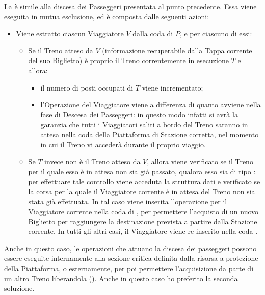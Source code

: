 \begin{description}
		La  è simile alla discesa dei Passeggeri presentata al punto precedente. Essa viene eseguita in mutua esclusione, ed è composta dalle seguenti azioni:
		\begin{itemize}
			\item Viene estratto ciascun Viaggiatore $V$ dalla coda  di $P$, e per ciascuno di essi:
			\begin{itemize}
				\item Se il Treno atteso da $V$ (informazione recuperabile dalla Tappa corrente del suo Biglietto) è proprio il Treno correntemente in esecuzione $T$ e  allora:
					\begin{itemize}
						\item il numero di posti occupati di $T$ viene incrementato;
						\item l'Operazione  del Viaggiatore viene  a differenza di quanto avviene nella fase di Descesa dei Passeggeri: in questo modo infatti si avrà la garanzia che tutti i Viaggiatori saliti a bordo del Treno saranno in attesa nella coda  della Piattaforma di Stazione corretta, nel momento in cui il Treno vi accederà durante il proprio viaggio. 
					\end{itemize}
				\item Se $T$ invece non è il Treno atteso da $V$, allora viene verificato se il Treno per il quale esso è in attesa non sia già passato, qualora esso sia di tipo : per effettuare tale controllo viene acceduta la struttura dati  e verificato se la corsa per la quale il Viaggiatore corrente è in attesa del Treno non sia stata già effettuata. In tal caso viene inserita l'operazione  per il Viaggiatore corrente nella coda di , per permettere l'acquisto di un nuovo Biglietto per raggiungere la destinazione prevista a partire dalla Stazione corrente. In tutti gli altri casi, il Viaggiatore viene re-inserito nella coda .
			\end {itemize}
		\end{itemize}
	\end {description}

	Anche in questo caso, le operazioni che attuano la discesa dei passeggeri possono essere eseguite internamente alla sezione critica definita dalla risorsa a protezione della Piattaforma, o esternamente, per poi permettere l'acquisizione da parte di un altro Treno liberandola (). Anche in questo caso ho preferito la seconda soluzione.


